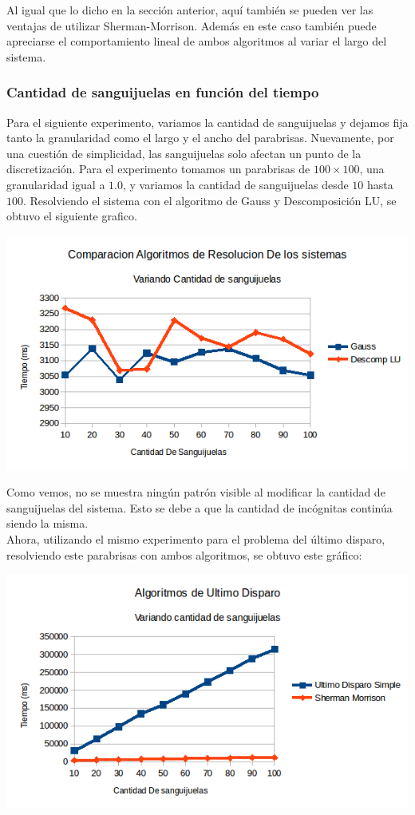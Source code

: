 Al igual que lo dicho en la sección anterior, aquí también se pueden ver las ventajas de utilizar Sherman-Morrison. Además en este caso también puede apreciarse el comportamiento lineal de ambos algoritmos al variar el largo del sistema.

\subsubsection{Cantidad de sanguijuelas en función del tiempo}
Para el siguiente experimento, variamos la cantidad de sanguijuelas y dejamos fija tanto la granularidad como el largo y el ancho del parabrisas. Nuevamente, por una cuestión de simplicidad, las sanguijuelas solo afectan un punto de la discretización. Para el experimento tomamos un parabrisas de $100 \times 100$, una granularidad igual a $1.0$, y variamos la cantidad de sanguijuelas desde $10$ hasta $100$. Resolviendo el sistema con el algoritmo de Gauss y Descomposición LU, se obtuvo el siguiente grafico.

\begin{center}
 \includegraphics[width=400pt]{imagenes/testeo/sangGauss.png}
\end{center}

Como vemos, no se muestra ningún patrón visible al modificar la cantidad de sanguijuelas del sistema. Esto se debe a que la cantidad de incógnitas continúa siendo la misma.
\\
Ahora, utilizando el mismo experimento para el problema del último disparo, resolviendo este parabrisas con ambos algoritmos, se obtuvo este gráfico:

\begin{center}
 \includegraphics[width=400pt]{imagenes/testeo/sangSalv.png}
\end{center}

